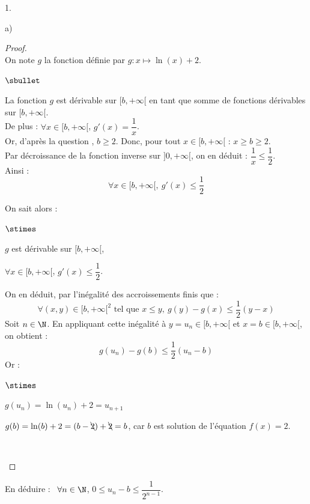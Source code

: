 \begin{noliste}{1.}
\begin{noliste}{a)}
    \begin{proof}~\\
      On note $g$ la fonction définie par $g :x \mapsto \ln(x)+2$.\\
      \begin{noliste}{$\sbullet$}
        \item La fonction $g$ est dérivable sur $[b,+\infty[$ en tant 
        que somme de fonctions dérivables sur $[b,+\infty[$.\\
        De plus : $\forall x \in [b,+\infty[$, $
          g'(x)= \dfrac{1}{x}$.\\
        Or, d'après la question , $b \geq 2$. Donc, pour tout 
        $x \in [b, +\infty[$ : $x \geq b \geq 2$.\\
        Par décroissance de la fonction inverse sur $]0,+\infty[$, on 
        en déduit : $\dfrac{1}{x} \leq \dfrac{1}{2}$.\\
        Ainsi :
        \[
          \forall x \in [b,+\infty[, \ g'(x) \leq \dfrac{1}{2}
        \]
        
        
        \newpage
        
        
        \item On sait alors :
        \begin{noliste}{$\stimes$}
	  \item $g$ est dérivable sur $[b,+\infty[$,
	  \item $\forall x \in [b,+\infty[$, $g'(x) \leq \dfrac{1}{2}$.
	\end{noliste}
	On en déduit, par l'inégalité des accroissements finis que :
	\[
	  \forall (x,y) \in [b,+\infty[^2 \text{ tel que } x\leq y, 
	  \ g(y) - g(x) \leq 
	  \dfrac{1}{2}(y-x)
	\]
	Soit $n\in \N$. En appliquant cette inégalité à $y = u_n \in 
	[b,+\infty[$ et $x=b \in [b,+\infty[$, on obtient :
	\[
	  g(u_n) - g(b) \leq \dfrac{1}{2} (u_n -b)
	\]
	Or :
	\begin{noliste}{$\stimes$}
	  \item $g(u_n) = \ln(u_n)+2 = u_{n+1}$
	  \item $g(b) = \ln(b)+2 = (b-\bcancel{2}) + \bcancel{2}=b$, 
	  car $b$ est solution de l'équation $f(x)=2$.
	\end{noliste}
	~\\[-1.4cm]
      \end{noliste}
    \end{proof}

    
  \item En déduire : \ $\forall n \in \N$, $0 \leq u_n-b \leq
    \dfrac{1}{2^{n-1}}$.
    

\end{noliste}
\end{noliste}

